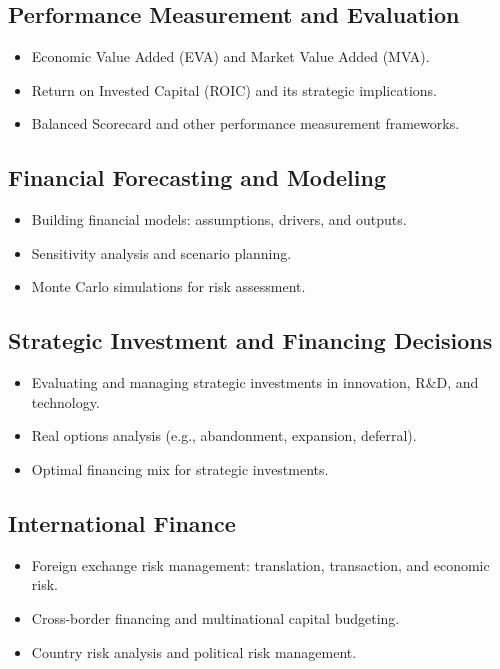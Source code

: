 \subsection{Performance Measurement and Evaluation}
\begin{itemize}
  \item Economic Value Added (EVA) and Market Value Added (MVA).
  \item Return on Invested Capital (ROIC) and its strategic implications.
  \item Balanced Scorecard and other performance measurement frameworks.
\end{itemize}

\subsection{Financial Forecasting and Modeling}
\begin{itemize}
  \item Building financial models: assumptions, drivers, and outputs.
  \item Sensitivity analysis and scenario planning.
  \item Monte Carlo simulations for risk assessment.
\end{itemize}

\subsection{Strategic Investment and Financing Decisions}
\begin{itemize}
  \item Evaluating and managing strategic investments in innovation, R\&D, and technology.
  \item Real options analysis (e.g., abandonment, expansion, deferral).
  \item Optimal financing mix for strategic investments.
\end{itemize}

\subsection{International Finance}
\begin{itemize}
  \item Foreign exchange risk management: translation, transaction, and economic risk.
  \item Cross-border financing and multinational capital budgeting.
  \item Country risk analysis and political risk management.
\end{itemize}

